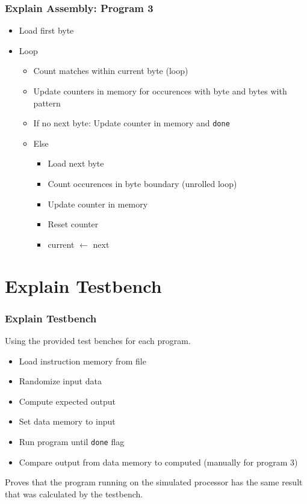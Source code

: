 	\begin{frame}
		\frametitle{Explain Assembly: Program 3}
		\begin{itemize}
			\item Load first byte
			\item Loop
				\begin{itemize}
					\item Count matches within current byte (loop)
					\item Update counters in memory for occurences with byte and bytes with pattern
					\item If no next byte: Update counter in memory and \texttt{done}
					\item Else
						\begin{itemize}
							\item Load next byte
							\item Count occurences in byte boundary (unrolled loop)
							\item Update counter in memory
							\item Reset counter
							\item current $\leftarrow$ next
						\end{itemize}
				\end{itemize}
		\end{itemize}
	\end{frame}

	\section{Explain Testbench}

	\begin{frame}
		\frametitle{Explain Testbench}

		Using the provided test benches for each program.

		\begin{itemize}
			\item Load instruction memory from file
			\item Randomize input data
			\item Compute expected output
			\item Set data memory to input
			\item Run program until \texttt{done} flag
			\item Compare output from data memory to computed (manually for program 3)
		\end{itemize}

		Proves that the program running on the simulated processor has the same result that was calculated by the testbench.
	\end{frame}

